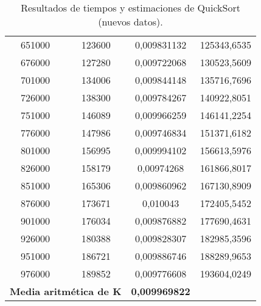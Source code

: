 \documentclass[a4paper,12pt]{article} %
\begin{document}
\begin{table}[H]
{\begin{tabular}{|c|c|c|c|}
			651000                                             & 123600               & 0,009831132          & 125343,6535                              \\
			676000                                             & 127280               & 0,009722068          & 130523,5609                              \\
			701000                                             & 134006               & 0,009844148          & 135716,7696                              \\
			726000                                             & 138300               & 0,009784267          & 140922,8051                              \\
			751000                                             & 146089               & 0,009966259          & 146141,2254                              \\
			776000                                             & 147986               & 0,009746834          & 151371,6182                              \\
			801000                                             & 156995               & 0,009994102          & 156613,5976                              \\
			826000                                             & 158179               & 0,00974268           & 161866,8017                              \\
			851000                                             & 165306               & 0,009860962          & 167130,8909                              \\
			876000                                             & 173671               & 0,010043             & 172405,5452                              \\
			901000                                             & 176034               & 0,009876882          & 177690,4631                              \\
			926000                                             & 180388               & 0,009828307          & 182985,3596                              \\
			951000                                             & 186721               & 0,009886746          & 188289,9653                              \\
			976000                                             & 189852               & 0,009776608          & 193604,0249                              \\
			\hline
			\multicolumn{2}{l}{\textbf{Media aritmética de K}} & \textbf{0,009969822}                                                                   \\
			\hline
		\end{tabular}%
	}
	\caption{Resultados de tiempos y estimaciones de QuickSort (nuevos datos).}
	\label{tab:resultados_nuevos}
\end{table}
\end{document}

